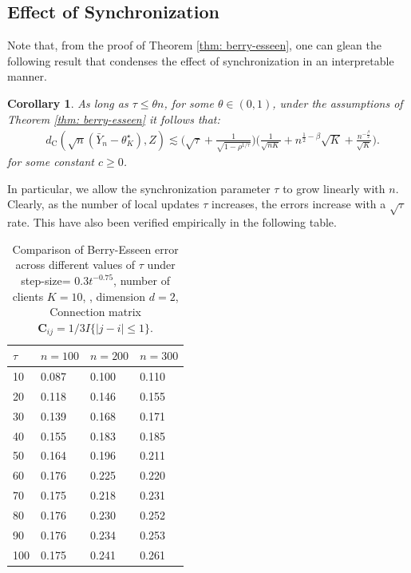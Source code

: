 \documentclass[a4paper,11pt]{article}
\numberwithin{equation}{section}
\theoremstyle{plain}
\newtheorem{corol}[theorem]{Corollary}
\theoremstyle{remark}
\begin{document}
\subsection{Effect of Synchronization}

Note that, from the proof of Theorem \ref{thm: berry-esseen}, one can glean the following result that condenses the effect of synchronization in an interpretable manner.
\begin{corol}
     As long as $\tau \leq \theta n$, for some $\theta \in (0,1)$, under the assumptions of Theorem \ref{thm: berry-esseen} it follows that: 
\begin{align}
    &d_{\mathrm{C}}( \sqrt{n}(\bar{Y}_n - \theta_K^\star) , Z) \lesssim  \big(\sqrt{\tau} + \frac{1}{\sqrt{1- \rho^{1/\tau}}}\big) \bigg(\frac{1}{\sqrt{nK}}  + n^{\frac{1}{2}-\beta} \sqrt{K} + \frac{n^{-\frac{\beta}{2}}}{\sqrt{K}}\bigg).
\end{align} 
for some constant $c \geq 0$. 
\end{corol}
In particular, we allow the synchronization parameter $\tau$ to grow linearly with $n$. Clearly, as the number of local updates $\tau$ increases, the errors increase with a $\sqrt{\tau}$ rate. This have {also} been verified {empirically} in the following table. 
\begin{table}[h]
    \centering
    \begin{tabular}{|l|l|l|l|}
        \hline
       $\tau$ & $n=100$ & $n=200$ & $n=300$ \\
\hline
10  & 0.087 & 0.100 & 0.110 \\
20  & 0.118 & 0.146 & 0.155 \\
30  & 0.139 & 0.168 & 0.171 \\
40  & 0.155 & 0.183 & 0.185 \\
50  & 0.164 & 0.196 & 0.211 \\
60  & 0.176 & 0.225 & 0.220 \\
70  & 0.175 & 0.218 & 0.231 \\
80  & 0.176 & 0.230 & 0.252 \\
90  & 0.176 & 0.234 & 0.253 \\
100 & 0.175 & 0.241 & 0.261 \\
\hline 
    \end{tabular}
    \caption{Comparison of Berry-Esseen error across different values of $\tau$ under step-size= $0.3t^{-0.75}$, number of clients $K=10$, , dimension $d=2$, Connection matrix $\mathbf{C}_{ij}=1/3 I\{|j-i|\leq 1\}$.}
\end{table}
\end{document}
